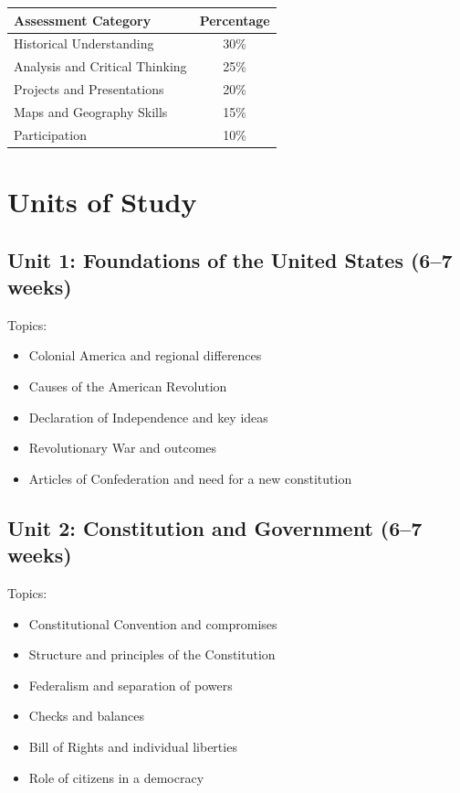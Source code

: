 \documentclass[11pt,letterpaper]{report}
\begin{document}
\begin{center}
\begin{tabular}{|l|c|}
\hline
\textbf{Assessment Category} & \textbf{Percentage} \\
\hline
Historical Understanding & 30\% \\
\hline
Analysis and Critical Thinking & 25\% \\
\hline
Projects and Presentations & 20\% \\
\hline
Maps and Geography Skills & 15\% \\
\hline
Participation & 10\% \\
\hline
\end{tabular}
\end{center}

\section{Units of Study}

\subsection{Unit 1: Foundations of the United States (6–7 weeks)}

Topics:
\begin{itemize}
\item Colonial America and regional differences
\item Causes of the American Revolution
\item Declaration of Independence and key ideas
\item Revolutionary War and outcomes
\item Articles of Confederation and need for a new constitution
\end{itemize}

\subsection{Unit 2: Constitution and Government (6–7 weeks)}

Topics:
\begin{itemize}
\item Constitutional Convention and compromises
\item Structure and principles of the Constitution
\item Federalism and separation of powers
\item Checks and balances
\item Bill of Rights and individual liberties
\item Role of citizens in a democracy
\end{itemize}
\end{document}
